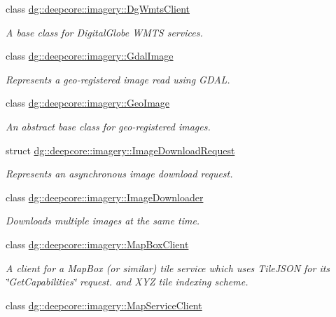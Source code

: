 \begin{DoxyCompactItemize}
class \hyperlink{classdg_1_1deepcore_1_1imagery_1_1_dg_wmts_client}{dg\+::deepcore\+::imagery\+::\+Dg\+Wmts\+Client}
\begin{DoxyCompactList}\small\item\em A base class for Digital\+Globe W\+M\+TS services. \end{DoxyCompactList}\item 
class \hyperlink{classdg_1_1deepcore_1_1imagery_1_1_gdal_image}{dg\+::deepcore\+::imagery\+::\+Gdal\+Image}
\begin{DoxyCompactList}\small\item\em Represents a geo-\/registered image read using G\+D\+AL. \end{DoxyCompactList}\item 
class \hyperlink{classdg_1_1deepcore_1_1imagery_1_1_geo_image}{dg\+::deepcore\+::imagery\+::\+Geo\+Image}
\begin{DoxyCompactList}\small\item\em An abstract base class for geo-\/registered images. \end{DoxyCompactList}\item 
struct \hyperlink{structdg_1_1deepcore_1_1imagery_1_1_image_download_request}{dg\+::deepcore\+::imagery\+::\+Image\+Download\+Request}
\begin{DoxyCompactList}\small\item\em Represents an asynchronous image download request. \end{DoxyCompactList}\item 
class \hyperlink{classdg_1_1deepcore_1_1imagery_1_1_image_downloader}{dg\+::deepcore\+::imagery\+::\+Image\+Downloader}
\begin{DoxyCompactList}\small\item\em Downloads multiple images at the same time. \end{DoxyCompactList}\item 
class \hyperlink{classdg_1_1deepcore_1_1imagery_1_1_map_box_client}{dg\+::deepcore\+::imagery\+::\+Map\+Box\+Client}
\begin{DoxyCompactList}\small\item\em A client for a Map\+Box (or similar) tile service which uses Tile\+J\+S\+ON for its \char`\"{}\+Get\+Capabilities\char`\"{} request. and X\+YZ tile indexing scheme. \end{DoxyCompactList}\item 
class \hyperlink{classdg_1_1deepcore_1_1imagery_1_1_map_service_client}{dg\+::deepcore\+::imagery\+::\+Map\+Service\+Client}

\end{DoxyCompactItemize}
